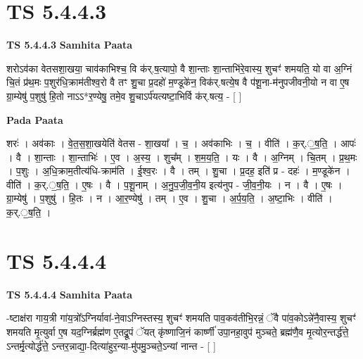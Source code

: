\documentclass[17pt]{extarticle}
\begin{document}

\section{ TS 5.4.4.3 }

\textbf{TS 5.4.4.3 } \newline
\textbf{Samhita Paata} \newline

शरोऽव॑का वेतसशा॒खया॒ चाव॑काभिश्च॒ वि क॑र्.ष॒त्यापो॒ वै शा॒न्ताः शा॒न्ताभि॑रे॒वास्य॒ शुचꣳ॑ शमयति॒ यो वा अ॒ग्निं चि॒तं प्र॑थ॒मः प॒शुर॑धि॒क्राम॑तीश्व॒रो वै तꣳ शु॒चा प्र॒दहो॑ म॒ण्डूके॑न॒ विक॑र्.षत्ये॒ष वै प॑शू॒ना-म॑नुपजीवनी॒यो न वा ए॒ष ग्रा॒म्येषु॑ प॒शुषु॑ हि॒तो नाऽऽ*र॒ण्येषु॒ तमे॒व शु॒चाऽर्प॑यत्यष्टा॒भिर्वि क॑र्.षत्य॒ - [  ] \newline

\textbf{Pada Paata} \newline

शरः॑ । अव॑काः । वे॒त॒स॒शा॒खयेति॑ वेतस - शा॒खया᳚ । च॒ । अव॑काभिः । च॒ । वीति॑ । क॒र्.॒ष॒ति॒ । आपः॑ । वै । शा॒न्ताः । शा॒न्ताभिः॑ । ए॒व । अ॒स्य॒ । शुच᳚म् । श॒म॒य॒ति॒ । यः । वै । अ॒ग्निम् । चि॒तम् । प्र॒थ॒मः । प॒शुः । अ॒धि॒क्राम॒तीत्य॑धि-क्राम॑ति । ई॒श्व॒रः । वै । तम् । शु॒चा । प्र॒दह॒ इति॑ प्र - दहः॑ । म॒ण्डूके॑न । वीति॑ । क॒र्.॒ष॒ति॒ । ए॒षः । वै । प॒शू॒नाम् । अ॒नु॒प॒जी॒व॒नी॒य इत्य॑नुप -  जी॒व॒नी॒यः । न । वै । ए॒षः । ग्रा॒म्येषु॑ । प॒शुषु॑ । हि॒तः । न । आ॒र॒ण्येषु॑ । तम् । ए॒व । शु॒चा । अ॒र्प॒य॒ति॒ । अ॒ष्टा॒भिः । वीति॑ । क॒र्.॒ष॒ति॒ ।  \newline





\section{ TS 5.4.4.4 }

\textbf{TS 5.4.4.4 } \newline
\textbf{Samhita Paata} \newline

-ष्टाक्ष॑रा गाय॒त्री गा॑य॒त्रो᳚ऽग्निर्यावा॑-ने॒वाऽग्निस्तस्य॒ शुचꣳ॑ शमयति पाव॒कव॑तीभि॒रन्नं॒ ॅवै पा॑व॒कोऽन्ने॑नै॒वास्य॒ शुचꣳ॑ शमयति मृ॒त्युर्वा ए॒ष यद॒ग्निर्ब्रह्म॑ण ए॒तद्रू॒पं ॅयत् कृ॑ष्णाजि॒नं कार्ष्णी॑ उपा॒नहा॒वुप॑ मुञ्चते॒ ब्रह्म॑णै॒व मृ॒त्योर॒न्तर्द्ध॑त्ते॒ ऽन्तर्मृ॒त्योर्द्ध॑त्ते॒ ऽन्तर॒न्नाद्या॒-दित्या॑हुर॒न्या-मु॑पमु॒ञ्चते॒ऽन्यां नान्त - [  ] \newline
\end{document}
